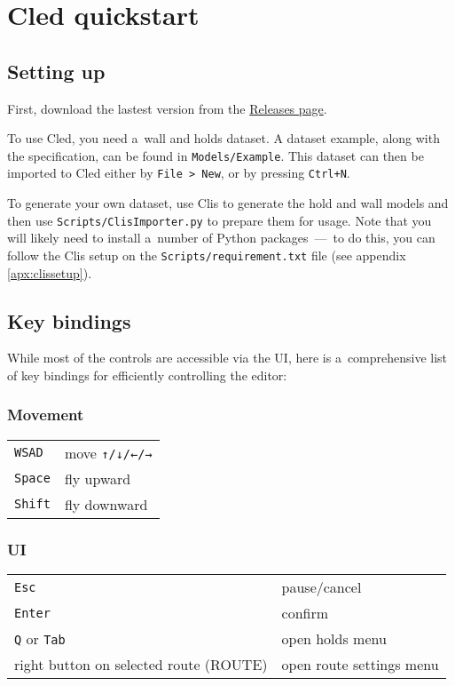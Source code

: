 \chapter{Cled quickstart}\label{apx:cled}

\section{Setting up}
First, download the lastest version from the \href{https://github.com/Climber-Tools/Cled/releases}{Releases page}.

To use Cled, you need a~wall and holds dataset.
A dataset example, along with the specification, can be found in \verb|Models/Example|.
This dataset can then be imported to Cled either by \verb|File > New|, or by pressing
\verb|Ctrl+N|.

To generate your own dataset, use Clis \cite{clis} to generate the hold and wall models and then use \verb|Scripts/ClisImporter.py| to prepare them for usage.
Note that you will likely need to install a~number of Python packages~---~to do this, you can follow the Clis setup on the \verb|Scripts/requirement.txt| file (see appendix \ref{apx:clissetup}).

\section{Key bindings}

While most of the controls are accessible via the UI, here is a~comprehensive list of key bindings for efficiently controlling the editor:

\subsection{Movement}

\begin{tabular}[]{@{}ll@{}}
\toprule
\verb|WSAD| & move \verb|↑/↓/←/→| \\
\verb|Space| & fly upward \\
\verb|Shift| & fly downward \\
\bottomrule
\end{tabular}

\subsection{UI}

\begin{tabular}[]{@{}ll@{}}
\toprule
\verb|Esc| & pause/cancel \\
\verb|Enter| & confirm \\
\verb|Q| or \verb|Tab| & open holds menu \\
right button on selected route (ROUTE) & open route settings menu \\
\bottomrule
\end{tabular}

